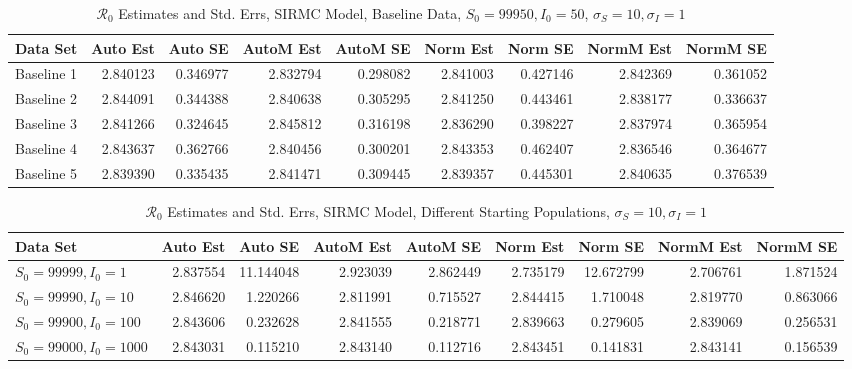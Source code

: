 \documentclass[12pt]{article}
\newcommand{\rr}{\ensuremath{\mathcal{R}_0}}
\begin{document}
\begin{table}[H]
	
	\caption{$\rr$ Estimates and Std. Errs, SIRMC Model,
		Baseline Data, $S_0 = 99950, I_0 = 50$, 
		$\sigma_S = 10, \sigma_I = 1$}
	\begin{footnotesize}
		\hskip -1cm
	\begin{tabular}{l|r|r|r|r|r|r|r|r}
		\hline
		Data Set & Auto Est & Auto SE & AutoM Est & AutoM SE & Norm Est & Norm SE & NormM Est & NormM SE\\
		\hline
		Baseline 1 & 2.840123 & 0.346977 & 2.832794 & 0.298082 & 2.841003 & 0.427146 & 2.842369 & 0.361052\\
		\hline
		Baseline 2 & 2.844091 & 0.344388 & 2.840638 & 0.305295 & 2.841250 & 0.443461 & 2.838177 & 0.336637\\
		\hline
		Baseline 3 & 2.841266 & 0.324645 & 2.845812 & 0.316198 & 2.836290 & 0.398227 & 2.837974 & 0.365954\\
		\hline
		Baseline 4 & 2.843637 & 0.362766 & 2.840456 & 0.300201 & 2.843353 & 0.462407 & 2.836546 & 0.364677\\
		\hline
		Baseline 5 & 2.839390 & 0.335435 & 2.841471 & 0.309445 & 2.839357 & 0.445301 & 2.840635 & 0.376539\\
		\hline
	\end{tabular}
\end{footnotesize}
\end{table}

\begin{table}[H]
	
	\caption{$\rr$ Estimates and Std. Errs, SIRMC Model,
		Different Starting Populations, 
		$\sigma_S = 10, \sigma_I = 1$}
	\begin{footnotesize}
		\hskip -1.7cm
	\begin{tabular}{l|r|r|r|r|r|r|r|r}
		\hline
		Data Set & Auto Est & Auto SE & AutoM Est & AutoM SE & Norm Est & Norm SE & NormM Est & NormM SE\\
		\hline
		$S_0 = 99999, I_0 = 1$ & 2.837554 & 11.144048 & 2.923039 & 2.862449 & 2.735179 & 12.672799 & 2.706761 & 1.871524\\
		\hline
		$S_0 = 99990, I_0 = 10$ & 2.846620 & 1.220266 & 2.811991 & 0.715527 & 2.844415 & 1.710048 & 2.819770 & 0.863066\\
		\hline
		$S_0 = 99900, I_0 = 100$ & 2.843606 & 0.232628 & 2.841555 & 0.218771 & 2.839663 & 0.279605 & 2.839069 & 0.256531\\
		\hline
		$S_0 = 99000, I_0 = 1000$ & 2.843031 & 0.115210 & 2.843140 & 0.112716 & 2.843451 & 0.141831 & 2.843141 & 0.156539\\
		\hline
	\end{tabular}
\end{footnotesize}
\end{table}
\end{document}

